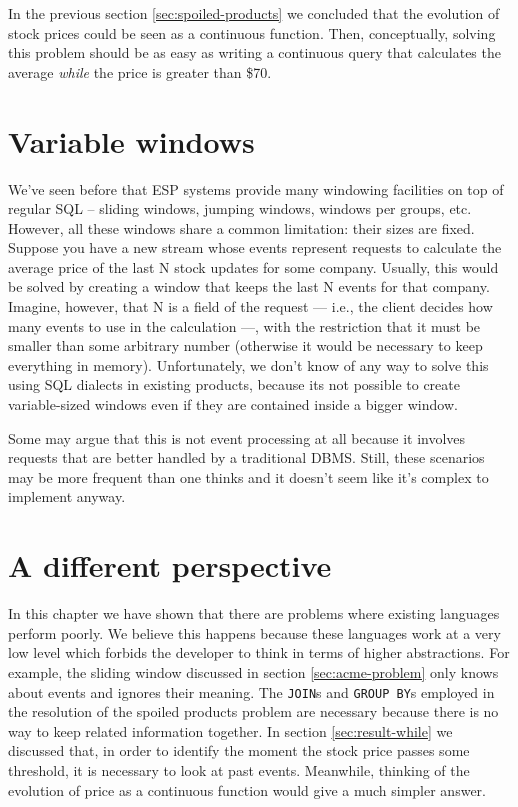 \documentclass{report}
\begin{document}
In the previous section \ref{sec:spoiled-products} we concluded that
the evolution of stock prices could be seen as a continuous
function. Then, conceptually, solving this problem should be as easy
as writing a continuous query that calculates the average \emph{while}
the price is greater than \$70.


\section{Variable windows}

We've seen before that ESP systems provide many windowing facilities
on top of regular SQL -- sliding windows, jumping windows, windows per
groups, etc. However, all these windows share a common limitation:
their sizes are fixed. Suppose you have a new stream whose events
represent requests to calculate the average price of the last N stock
updates for some company. Usually, this would be solved by creating a
window that keeps the last N events for that company. Imagine,
however, that N is a field of the request --- i.e., the client decides
how many events to use in the calculation ---, with the restriction
that it must be smaller than some arbitrary number (otherwise it would
be necessary to keep everything in memory). Unfortunately, we don't
know of any way to solve this using SQL dialects in existing products,
because its not possible to create variable-sized windows even if they
are contained inside a bigger window.

Some may argue that this is not event processing at all because it
involves requests that are better handled by a traditional
DBMS. Still, these scenarios may be more frequent than one thinks and
it doesn't seem like it's complex to implement anyway.

\section{A different perspective}

In this chapter we have shown that there are problems where existing
languages perform poorly. We believe this happens because these
languages work at a very low level which forbids the developer to
think in terms of higher abstractions. For example, the sliding window
discussed in section \ref{sec:acme-problem} only knows about events and
ignores their meaning. The \verb=JOIN=s and \verb=GROUP BY=s employed
in the resolution of the spoiled products problem are necessary
because there is no way to keep related information together. In
section \ref{sec:result-while} we discussed that, in order to identify
the moment the stock price passes some threshold, it is necessary to
look at past events. Meanwhile, thinking of the evolution of price as
a continuous function would give a much simpler answer.
\end{document}
